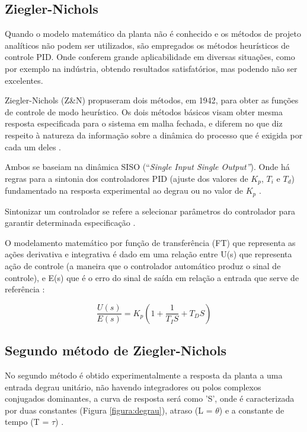 \documentclass[conference]{IEEEtran}
\begin{document}
\subsection{Ziegler-Nichols}

Quando o modelo matemático da planta não é conhecido e os métodos de projeto analíticos não podem ser utilizados, são empregados os métodos heurísticos de controle PID. Onde conferem grande aplicabilidade em diversas situações, como por exemplo na indústria, obtendo resultados satisfatórios, mas podendo não ser excelentes.

Ziegler-Nichols (Z\&N) propuseram dois métodos, em 1942, para obter as funções de controle de modo heurístico. Os dois métodos básicos visam obter mesma resposta especificada para o sistema em malha fechada, e diferem no que diz respeito à natureza da informação sobre a dinâmica do processo que é exigida por cada um deles \cite{teixeira2010controles}.

Ambos se baseiam na dinâmica SISO (“\textit{Single Input Single Output”}). Onde há regras para a sintonia dos controladores PID (ajuste dos valores de \(K_{p}\), \(T_{i}\) e \(T_{d}\))  fundamentado na resposta experimental ao degrau ou no valor de \(K_{p}\) \cite{teixeira2010controles}.

Sintonizar um controlador se refere a selecionar parâmetros do controlador para garantir determinada especificação \cite{ogata2011engenharia}.

O modelamento matemático por função de transferência (FT) que representa as ações derivativa e integrativa é dado em uma relação entre U(s) que representa ação de controle (a maneira que o controlador automático produz o sinal de controle), e E(s) que é o erro do sinal de saída em relação a entrada que serve de referência \cite{ogata2011engenharia}:

\begin{equation}
    \frac{U(s)}{E(s)} = K_p   (1 + \frac{1}{T_I S} + T_D S)
\end{equation}

\subsection{Segundo método de Ziegler-Nichols}

No segundo método é obtido experimentalmente a resposta da planta a uma entrada degrau unitário, não havendo integradores ou polos complexos conjugados dominantes, a curva de resposta será como 'S', onde é caracterizada por duas constantes (Figura \ref{figura:degrau}), atraso (L = \(\theta\)) e a constante de tempo (T = \(\tau\)) \cite{teixeira2010controles}.
\end{document}
